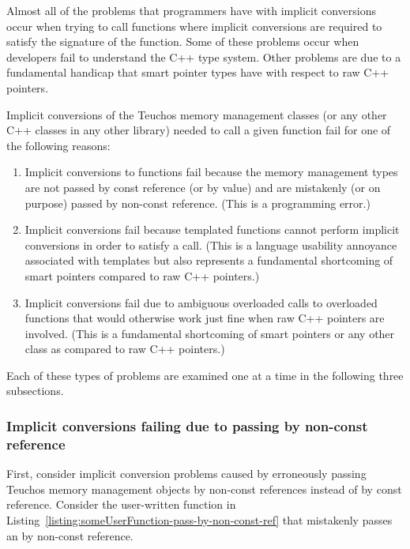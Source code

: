 \documentclass[pdf,ps2pdf,11pt]{SANDreport}
\begin{document}
Almost all of the problems that programmers have with implicit
conversions occur when trying to call functions where implicit
conversions are required to satisfy the signature of the function.
Some of these problems occur when developers fail to understand the
C++ type system.  Other problems are due to a fundamental handicap
that smart pointer types have with respect to raw C++ pointers.

Implicit conversions of the Teuchos memory management classes (or any
other C++ classes in any other library) needed to call a given
function fail for one of the following reasons:

\begin{enumerate}

{}\item{}Implicit conversions to functions fail because the memory
management types are not passed by const reference (or by value) and
are mistakenly (or on purpose) passed by non-const reference. (This is
a programming error.)

{}\item{}Implicit conversions fail because templated functions cannot
perform implicit conversions in order to satisfy a call. (This is a
language usability annoyance associated with templates but also
represents a fundamental shortcoming of smart pointers compared to raw
C++ pointers.)

{}\item{}Implicit conversions fail due to ambiguous overloaded calls
to overloaded functions that would otherwise work just fine when raw
C++ pointers are involved. (This is a fundamental shortcoming of smart
pointers or any other class as compared to raw C++ pointers.)

\end{enumerate}

Each of these types of problems are examined one at a time in the
following three subsections.


%
{}\subsubsection*{Implicit conversions failing due to passing by
non-const reference}
%


First, consider implicit conversion problems caused by erroneously
passing Teuchos memory management objects by non-const references
instead of by const reference.  Consider the user-written function in
Listing~\ref{listing:someUserFunction-pass-by-non-const-ref} that
mistakenly passes an {} by non-const reference.
\end{document}
